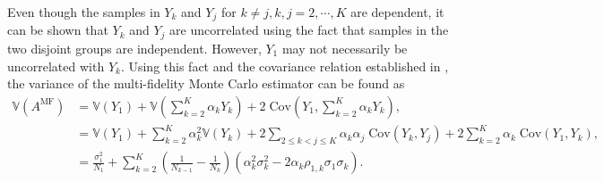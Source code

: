\documentclass[final,3p,times,11pt]{elsarticle}
\begin{document}
Even though the samples in $Y_k$ and $Y_j$ for $k\neq j, k,j=2,\cdots, K$ are dependent, it can be shown that $Y_k$ and $Y_j$ are uncorrelated using the fact that samples in the two disjoint groups are independent. However, $Y_1$ may not necessarily be uncorrelated with $Y_k$. Using this fact and the covariance relation established in \cite[Lemma~3.2]{PeWiGu:2016},
the variance of the multi-fidelity Monte Carlo estimator can be found as
\begin{align}
    \nonumber
    \mathbb{V}\left(A^{\text{MF}}\right) &= \mathbb{V}\left(Y_1\right) + \mathbb{V}\left(\sum_{k=2}^K \alpha_kY_k\right)+2\;\text{Cov}\left(Y_1,\sum_{k=2}^K \alpha_k Y_k \right),\\
    \nonumber
    &=\mathbb{V}\left(Y_1\right) + \sum_{k=2}^K \alpha_k^2 \mathbb{V}\left(Y_k\right)+2\sum_{2\le k<j\le K} \alpha_k\alpha_j\; \text{Cov}(Y_k,Y_j) +2\sum_{k=2}^K \alpha_k\;\text{Cov}\left(Y_1, Y_k\right),\\
    \label{eq:MFMC_variance}
    &=\frac{\sigma_1^2}{N_1} + \sum_{k=2}^K \left(\frac{1}{N_{k-1}} - \frac{1}{N_k}\right)\left(\alpha_k^2\sigma_k^2 - 2\alpha_k\rho_{1,k}\sigma_1\sigma_k\right).
\end{align}
\end{document}
